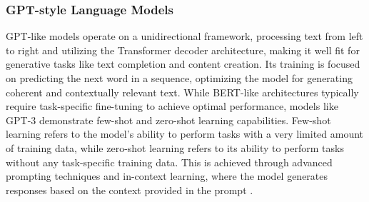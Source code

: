 \documentclass[fleqn,10pt]{olplainarticle}
\begin{document}
\subsubsection*{GPT-style Language Models}
GPT-like models operate on a unidirectional framework, processing text from left to right and utilizing the Transformer decoder architecture, making it well fit for generative tasks like text completion and content creation. Its training is focused on predicting the next word in a sequence, optimizing the model for generating coherent and contextually relevant text. While BERT-like architectures typically require task-specific fine-tuning to achieve optimal performance, models like GPT-3 demonstrate few-shot and zero-shot learning capabilities. Few-shot learning refers to the model's ability to perform tasks with a very limited amount of training data, while zero-shot learning refers to its ability to perform tasks without any task-specific training data. This is achieved through advanced prompting techniques and in-context learning, where the model generates responses based on the context provided in the prompt \citep{zhang2021commentary}.

\end{document}
